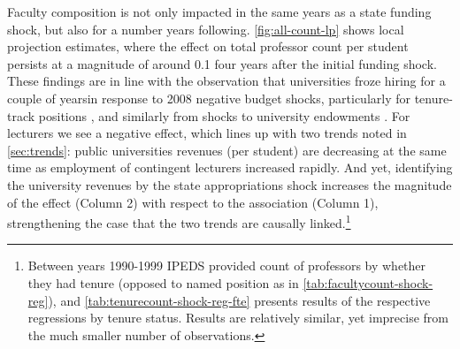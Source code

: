 Faculty composition is not only impacted in the same years as a state funding shock, but also for a number years following.
\autoref{fig:all-count-lp} shows local projection estimates, where the effect on total professor count per student persists at a magnitude of around 0.1 four years after the initial funding shock.
These findings are in line with the observation that universities froze hiring for a couple of yearsin response to 2008 negative budget shocks, particularly for tenure-track positions \citep{turner2014impact}, and similarly from shocks to university endowments \citep{brown2014endowment}.
For lecturers we see a negative effect, which lines up with two trends noted in \autoref{sec:trends}: public universities revenues (per student) are decreasing at the same time as employment of contingent lecturers increased rapidly.
And yet, identifying the university revenues by the state appropriations shock increases the magnitude of the effect (Column 2) with respect to the association (Column 1), strengthening the case that the two trends are causally linked.\footnote{
    Between years 1990-1999 IPEDS provided count of professors by whether they had tenure (opposed to named position as in \autoref{tab:facultycount-shock-reg}), and \autoref{tab:tenurecount-shock-reg-fte} presents results of the respective regressions by tenure status.
    Results are relatively similar, yet imprecise from the much smaller number of observations.
}

